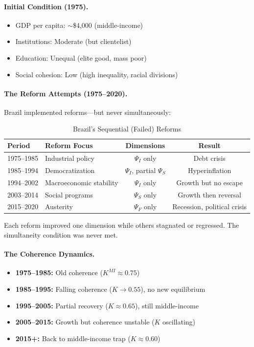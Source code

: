 \paragraph{Initial Condition (1975).}
\begin{itemize}
    \item GDP per capita: $\sim$\$4,000 (middle-income)
    \item Institutions: Moderate (but clientelist)
    \item Education: Unequal (elite good, mass poor)
    \item Social cohesion: Low (high inequality, racial divisions)
\end{itemize}

\paragraph{The Reform Attempts (1975--2020).}
Brazil implemented reforms---but never simultaneously:

\begin{table}[htbp]
\centering
\caption{Brazil's Sequential (Failed) Reforms}
\label{tab:brazil-reforms}
\begin{tabular}{@{}llcc@{}}
\toprule
\textbf{Period} & \textbf{Reform Focus} & \textbf{Dimensions} & \textbf{Result} \\
\midrule
1975--1985 & Industrial policy & $\Psi_I$ only & Debt crisis \\
1985--1994 & Democratization & $\Psi_I$, partial $\Psi_S$ & Hyperinflation \\
1994--2002 & Macroeconomic stability & $\Psi_I$ only & Growth but no escape \\
2003--2014 & Social programs & $\Psi_S$ only & Growth then reversal \\
2015--2020 & Austerity & $\Psi_F$ only & Recession, political crisis \\
\bottomrule
\end{tabular}
\end{table}

Each reform improved one dimension while others stagnated or regressed.
The simultaneity condition was never met.

\paragraph{The Coherence Dynamics.}
\begin{itemize}
    \item \textbf{1975--1985:} Old coherence ($K^{MI} \approx 0.75$)
    \item \textbf{1985--1995:} Falling coherence ($K \to 0.55$), no new equilibrium
    \item \textbf{1995--2005:} Partial recovery ($K \approx 0.65$), still middle-income
    \item \textbf{2005--2015:} Growth but coherence unstable ($K$ oscillating)
    \item \textbf{2015+:} Back to middle-income trap ($K \approx 0.60$)
\end{itemize}

